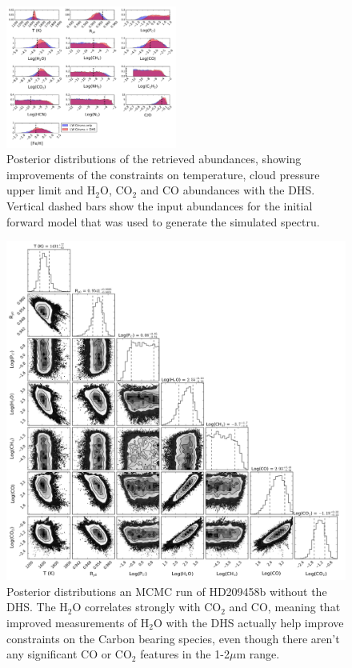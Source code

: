 \documentclass{emulateapj}
\begin{document}
\begin{figure}
\centering
\includegraphics[width=0.5\textwidth]{HD209458b_solar_clear_DHS.pdf}
\caption{Posterior distributions of the retrieved abundances, showing improvements of the constraints on temperature, cloud pressure upper limit and H$_2$O, CO$_2$ and CO abundances with the DHS. Vertical dashed bars show the input abundances for the initial forward model that was used to generate the simulated spectru.}\label{fig:DHSadded}
\end{figure}


\begin{figure}
\centering
\includegraphics[width=1.0\textwidth]{HD209458b_solar_clear_1trans_nc_only_subset.png}
\caption{Posterior distributions an MCMC run of HD209458b without the DHS. The H$_2$O correlates strongly with CO$_2$ and CO, meaning that improved measurements of H$_2$O with the DHS actually help improve constraints on the Carbon bearing species, even though there aren't any significant CO or CO$_2$ features in the 1-2$\mu$m range.}\label{fig:cornerRun}
\end{figure}
\end{document}
